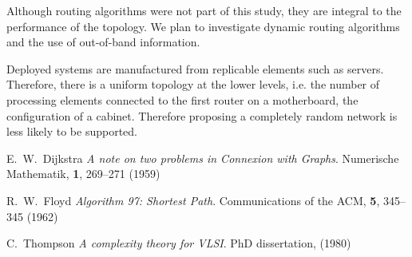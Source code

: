 \documentclass[pdftex]{article}
\begin{document}
Although routing algorithms were not part of this study, they are integral to the performance of the topology. We plan to investigate dynamic routing algorithms and the use of out-of-band information. 

Deployed systems are manufactured from replicable elements such as servers. Therefore, there is a uniform topology at the lower levels, i.e. the number of processing elements connected to the first router on a motherboard, the configuration of a cabinet. Therefore proposing a completely random network is less likely to be supported.

\begin{thebibliography}{99}

E.~W.~Dijkstra \textit{A note on two problems in Connexion with Graphs}. Numerische Mathematik, \textbf{1}, 269--271 (1959)

R.~W.~Floyd \textit{Algorithm 97: Shortest Path}. Communications of the ACM, \textbf{5}, 345--345 (1962)

C.~Thompson \textit{A complexity theory for VLSI}. PhD dissertation, (1980)

\end{thebibliography}
\end{document}
